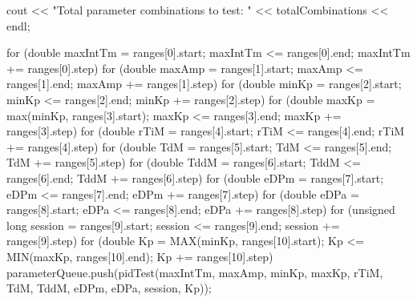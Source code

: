 \documentclass[a4paper,12pt]{report}
\begin{document}
\begin{lstlising}[language=C++]
\begin{lstlising}[language=C++]
{        cout << "Total parameter combinations to test: " << totalCombinations << endl;

        for (double maxIntTm = ranges[0].start; maxIntTm <= ranges[0].end; maxIntTm += ranges[0].step)
        {
                for (double maxAmp = ranges[1].start; maxAmp <= ranges[1].end; maxAmp += ranges[1].step)
                {
                        for (double minKp = ranges[2].start; minKp <= ranges[2].end; minKp += ranges[2].step)
                        {
                                for (double maxKp = max(minKp, ranges[3].start);
                                         maxKp <= ranges[3].end; maxKp += ranges[3].step)
                                {
                                        for (double rTiM = ranges[4].start; rTiM <= ranges[4].end; rTiM += ranges[4].step)
                                        {
                                                for (double TdM = ranges[5].start; TdM <= ranges[5].end; TdM += ranges[5].step)
                                                {
                                                        for (double TddM = ranges[6].start; TddM <= ranges[6].end; TddM += ranges[6].step)
                                                        {
                                                                for (double eDPm = ranges[7].start; eDPm <= ranges[7].end; eDPm += ranges[7].step)
                                                                {
                                                                        for (double eDPa = ranges[8].start; eDPa <= ranges[8].end; eDPa += ranges[8].step)
                                                                        {
                                                                                for (unsigned long session = ranges[9].start; session <= ranges[9].end; session += ranges[9].step)
                                                                                {
                                                                                        for (double Kp = MAX(minKp, ranges[10].start);
                                                                                                 Kp <= MIN(maxKp, ranges[10].end); Kp += ranges[10].step)
                                                                                        {
                                                                                                parameterQueue.push(pidTest({maxIntTm, maxAmp, minKp, maxKp, rTiM, TdM, TddM, eDPm, eDPa, session, Kp}));
                                                                                        }
                                                                                }
                                                                        }
                                                                }
                                                        }
                                                }
                                        }
                                }
                        }
                }
        }

}
\end{lstlising}
\end{lstlising}
\end{document}

